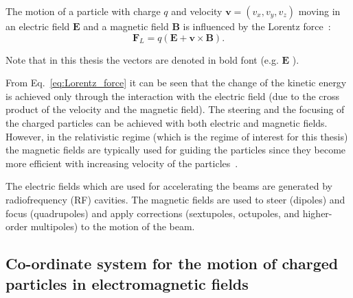 
The motion of a particle with charge $q$ and velocity $\mathbf{v}=(v_x, v_y, v_z)$ moving in an electric field $\mathbf{E}$ and a magnetic field $\mathbf{B}$ is influenced by the Lorentz force~\cite{Wiedemann:1083415}: 
\begin{equation}\label{eq:Lorentz_force}
 \mathbf{F}_L = q(\mathbf{E} + \mathbf{v} \times \mathbf{B}).
\end{equation}

Note that in this thesis the vectors are denoted in bold font (e.g. $\mathbf{E}$ ). %

From Eq.~\eqref{eq:Lorentz_force} it can be seen that the change of the kinetic energy is achieved only through the interaction with the electric field (due to the cross product of the velocity and the magnetic field). The steering and the focusing of the charged particles can be achieved with both electric and magnetic fields. However, in the relativistic regime (which is the regime of interest for this thesis) the magnetic fields are typically used for guiding the particles since they become more efficient with increasing velocity of the particles~\cite{Wiedemann:1083415}.

The electric fields which are used for accelerating the beams are generated by radiofrequency (RF) cavities. The magnetic fields are used to steer (dipoles) and focus (quadrupoles) and apply corrections (sextupoles, octupoles, and higher-order multipoles) to the motion of the beam. %


\subsection{Co-ordinate system for the motion of charged particles in electromagnetic fields}\label{subsec:coordinate_system}

